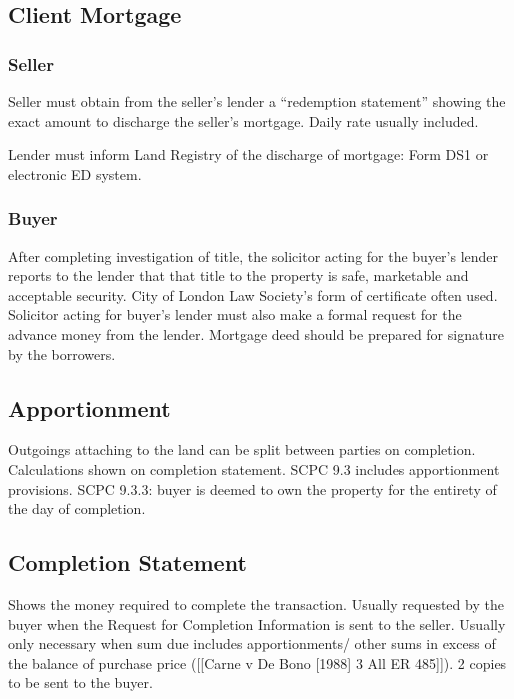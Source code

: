 \documentclass[
]{article}
\begin{document}
\hypertarget{client-mortgage}{%
\subsection{Client Mortgage}\label{client-mortgage}}

\hypertarget{seller}{%
\subsubsection{Seller}\label{seller}}

Seller must obtain from the seller's lender a ``redemption statement''
showing the exact amount to discharge the seller's mortgage. Daily rate
usually included.

Lender must inform Land Registry of the discharge of mortgage: Form DS1
or electronic ED system.

\hypertarget{buyer}{%
\subsubsection{Buyer}\label{buyer}}

After completing investigation of title, the solicitor acting for the
buyer's lender reports to the lender that that title to the property is
safe, marketable and acceptable security. City of London Law Society's
form of certificate often used. Solicitor acting for buyer's lender must
also make a formal request for the advance money from the lender.
Mortgage deed should be prepared for signature by the borrowers.

\hypertarget{apportionment}{%
\subsection{Apportionment}\label{apportionment}}

Outgoings attaching to the land can be split between parties on
completion. Calculations shown on completion statement. SCPC 9.3
includes apportionment provisions. SCPC 9.3.3: buyer is deemed to own
the property for the entirety of the day of completion.

\hypertarget{completion-statement}{%
\subsection{Completion Statement}\label{completion-statement}}

Shows the money required to complete the transaction. Usually requested
by the buyer when the Request for Completion Information is sent to the
seller. Usually only necessary when sum due includes apportionments/
other sums in excess of the balance of purchase price ({[}{[}Carne v De
Bono {[}1988{]} 3 All ER 485{]}{]}). 2 copies to be sent to the buyer.
\end{document}

